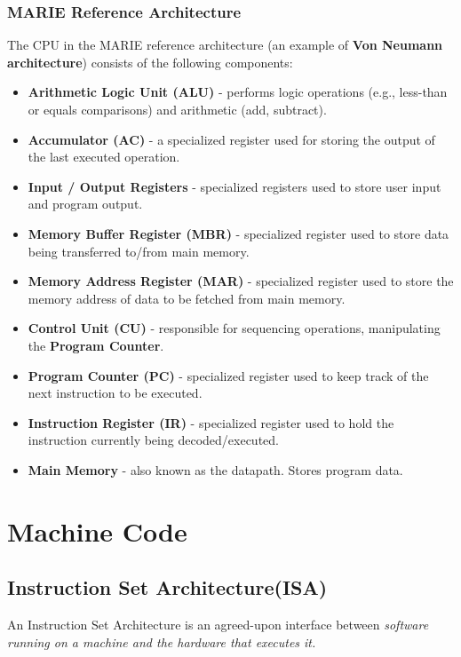 \documentclass[pdftex,10pt]{article}
\begin{document}
\subsubsection{MARIE Reference Architecture}
The CPU in the MARIE reference architecture (an example of \textbf{Von Neumann architecture}) consists of the following components:

\begin{itemize}
    \item \textbf{Arithmetic Logic Unit (ALU)} - performs logic operations (e.g., less-than or equals comparisons) and arithmetic (add, subtract).
    \item \textbf{Accumulator (AC)} - a specialized register used for storing the output of the last executed operation.
    \item \textbf{Input / Output Registers} - specialized registers used to store user input and program output.
    \item \textbf{Memory Buffer Register (MBR)} - specialized register used to store data being transferred to/from main memory.
    \item \textbf{Memory Address Register (MAR)} - specialized register used to store the memory address of data to be fetched from main memory.
    \item \textbf{Control Unit (CU)} - responsible for sequencing operations, manipulating the \textbf{Program Counter}.
    \item \textbf{Program Counter (PC)} - specialized register used to keep track of the next instruction to be executed.
    \item \textbf{Instruction Register (IR)} - specialized register used to hold the instruction currently being decoded/executed.
    \item \textbf{Main Memory} - also known as the datapath. Stores program data.
\end{itemize}


\section{Machine Code}
\subsection{Instruction Set Architecture(ISA)}

An Instruction Set Architecture is an agreed-upon interface between \em{software} running on a machine and the \em{hardware} that executes it.
\end{document}
